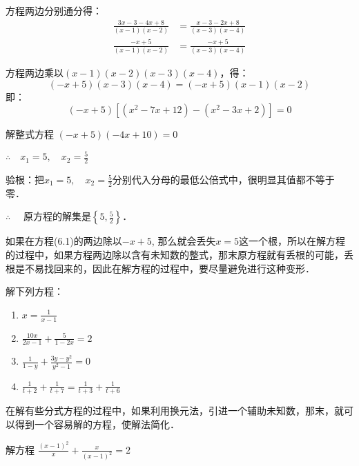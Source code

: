 \begin{solution}
    方程两边分别通分得：
\[\begin{split}
    \frac{3x-3-4x+8}{(x-1)(x-2)}&=\frac{x-3-2x+8}{(x-3)(x-4)}\\
    \frac{-x+5}{(x-1)(x-2)}&=\frac{-x+5}{(x-3)(x-4)}
\end{split}\]

方程两边乘以$(x-1)(x-2)(x-3)(x-4)$，得：
\begin{equation}
    (-x+5)(x-3)(x-4)=(-x+5)(x-1)(x-2)
\end{equation}
即：
\[(-x+5)[(x^2-7x+12)-(x^2-3x+2)]=0\]

解整式方程 $(-x+5)(-4x+10)=0$

$\therefore\quad x_1=5,\quad x_2=\frac{5}{2}$

验根：把$x_1=5,\quad x_2=\frac{5}{2}$分别代入分母的最低公倍式中，很明显其值都不等于零．

$\therefore\quad $ 原方程的解集是$\left\{5,\frac{5}{2}\right\}$．
\end{solution}

\begin{rmk}
  如果在方程(6.1)的两边除以$-x+5$, 那么就会丢失$x=5$这一个根，所以在解方程的过程中，如果方程两边除以含有未知数的整式，那末原方程就有丢根的可能，丢根是不易找回来的，因此在解方程的过程中，要尽量避免进行这种变形．    
\end{rmk}

\begin{ex}
解下列方程：
\begin{multicols}{2}
    \begin{enumerate}
        \item $x=\frac{1}{x-1}$
        \item $\frac{10x}{2x-1}+\frac{5}{1-2x}=2$
        \item $\frac{1}{1-y}+\frac{3y-y^2}{y^2-1}=0$
        \item $\frac{1}{t+2}+\frac{1}{t+7}=\frac{1}{t+3}+\frac{1}{t+6}$
    \end{enumerate}
\end{multicols}
\end{ex}

在解有些分式方程的过程中，如果利用换元法，引进一个辅助未知数，那末，就可以得到一个容易解的方程，使解法简化．


\begin{example}
解方程 $\frac{(x-1)^2}{x}+\frac{x}{(x-1)^2}=2$
\end{example}

